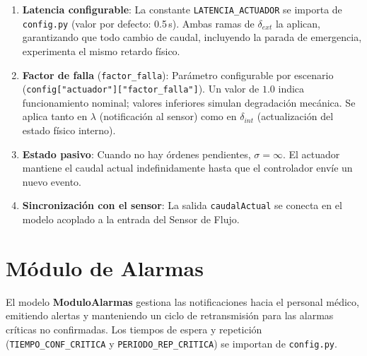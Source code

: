 \documentclass[12pt, a4paper]{article}
\begin{document}
\begin{enumerate}
    \item \textbf{Latencia configurable}: La constante \texttt{LATENCIA\_ACTUADOR}
    se importa de \texttt{config.py} (valor por defecto: 0.5\,s). Ambas ramas de
    $\delta_{\mathit{ext}}$ la aplican, garantizando que todo cambio de caudal,
    incluyendo la parada de emergencia, experimenta el mismo retardo físico.

    \item \textbf{Factor de falla} (\texttt{factor\_falla}): Parámetro configurable
    por escenario (\texttt{config["actuador"]["factor\_falla"]}). Un valor de
    $1.0$ indica funcionamiento nominal; valores inferiores simulan degradación
    mecánica. Se aplica tanto en $\lambda$ (notificación al sensor) como en
    $\delta_{\mathit{int}}$ (actualización del estado físico interno).

    \item \textbf{Estado pasivo}: Cuando no hay órdenes pendientes, $\sigma = \infty$.
    El actuador mantiene el caudal actual indefinidamente hasta que el controlador
    envíe un nuevo evento.

    \item \textbf{Sincronización con el sensor}: La salida \texttt{caudalActual}
    se conecta en el modelo acoplado a la entrada del Sensor de Flujo.
\end{enumerate}

\section{Módulo de Alarmas}

El modelo \textbf{ModuloAlarmas} gestiona las notificaciones hacia el personal médico,
emitiendo alertas y manteniendo un ciclo de retransmisión para las alarmas críticas
no confirmadas. Los tiempos de espera y repetición (\texttt{TIEMPO\_CONF\_CRITICA} y
\texttt{PERIODO\_REP\_CRITICA}) se importan de \texttt{config.py}.
\end{document}
